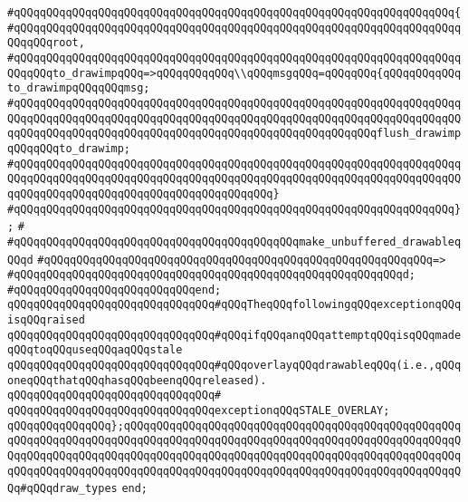 \verb|#qQQqqQQqqQQqqQQqqQQqqQQqqQQqqQQqqQQqqQQqqQQqqQQqqQQqqQQqqQQqqQQqqQQq{|\newline
\verb|#qQQqqQQqqQQqqQQqqQQqqQQqqQQqqQQqqQQqqQQqqQQqqQQqqQQqqQQqqQQqqQQqqQQqqQQqqQQqroot,|\newline
\verb|#qQQqqQQqqQQqqQQqqQQqqQQqqQQqqQQqqQQqqQQqqQQqqQQqqQQqqQQqqQQqqQQqqQQqqQQqqQQqto_drawimpqQQq=>qQQqqQQqqQQq\\qQQqmsgqQQq=qQQqqQQq{qQQqqQQqqQQqto_drawimpqQQqqQQqmsg;|\newline
\verb|#qQQqqQQqqQQqqQQqqQQqqQQqqQQqqQQqqQQqqQQqqQQqqQQqqQQqqQQqqQQqqQQqqQQqqQQqqQQqqQQqqQQqqQQqqQQqqQQqqQQqqQQqqQQqqQQqqQQqqQQqqQQqqQQqqQQqqQQqqQQqqQQqqQQqqQQqqQQqqQQqqQQqqQQqqQQqqQQqqQQqqQQqqQQqqQQqqQQqflush_drawimpqQQqqQQqto_drawimp;|\newline
\verb|#qQQqqQQqqQQqqQQqqQQqqQQqqQQqqQQqqQQqqQQqqQQqqQQqqQQqqQQqqQQqqQQqqQQqqQQqqQQqqQQqqQQqqQQqqQQqqQQqqQQqqQQqqQQqqQQqqQQqqQQqqQQqqQQqqQQqqQQqqQQqqQQqqQQqqQQqqQQqqQQqqQQqqQQqqQQqqQQqqQQq}|\newline
\verb|#qQQqqQQqqQQqqQQqqQQqqQQqqQQqqQQqqQQqqQQqqQQqqQQqqQQqqQQqqQQqqQQqqQQq};|\newline
\verb|#|\newline
\verb|#qQQqqQQqqQQqqQQqqQQqqQQqqQQqqQQqqQQqqQQqqQQqmake_unbuffered_drawableqQQqd|\newline
\verb|#qQQqqQQqqQQqqQQqqQQqqQQqqQQqqQQqqQQqqQQqqQQqqQQqqQQqqQQqqQQq=>|\newline
\verb|#qQQqqQQqqQQqqQQqqQQqqQQqqQQqqQQqqQQqqQQqqQQqqQQqqQQqqQQqqQQqd;|\newline
\verb|#qQQqqQQqqQQqqQQqqQQqqQQqqQQqend;|\newline
\newline
\verb|qQQqqQQqqQQqqQQqqQQqqQQqqQQqqQQq#qQQqTheqQQqfollowingqQQqexceptionqQQqisqQQqraised|\newline
\verb|qQQqqQQqqQQqqQQqqQQqqQQqqQQqqQQq#qQQqifqQQqanqQQqattemptqQQqisqQQqmadeqQQqtoqQQquseqQQqaqQQqstale|\newline
\verb|qQQqqQQqqQQqqQQqqQQqqQQqqQQqqQQq#qQQqoverlayqQQqdrawableqQQq(i.e.,qQQqoneqQQqthatqQQqhasqQQqbeenqQQqreleased).|\newline
\verb|qQQqqQQqqQQqqQQqqQQqqQQqqQQqqQQq#|\newline
\verb|qQQqqQQqqQQqqQQqqQQqqQQqqQQqqQQqexceptionqQQqSTALE_OVERLAY;|\newline
\newline
\verb|qQQqqQQqqQQqqQQq};qQQqqQQqqQQqqQQqqQQqqQQqqQQqqQQqqQQqqQQqqQQqqQQqqQQqqQQqqQQqqQQqqQQqqQQqqQQqqQQqqQQqqQQqqQQqqQQqqQQqqQQqqQQqqQQqqQQqqQQqqQQqqQQqqQQqqQQqqQQqqQQqqQQqqQQqqQQqqQQqqQQqqQQqqQQqqQQqqQQqqQQqqQQqqQQqqQQqqQQqqQQqqQQqqQQqqQQqqQQqqQQqqQQqqQQqqQQqqQQqqQQqqQQqqQQqqQQqqQQqqQQq#qQQqdraw_types|\newline
\verb|end;|\newline
\newline

